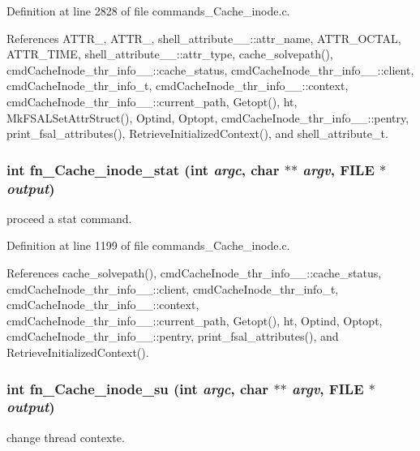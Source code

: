 Definition at line 2828 of file commands\_\-Cache\_\-inode.c.

References ATTR\_, ATTR\_, shell\_\-attribute\_\-\_\-::attr\_\-name, ATTR\_\-OCTAL, ATTR\_\-TIME, shell\_\-attribute\_\-\_\-::attr\_\-type, cache\_\-solvepath(), cmd\-Cache\-Inode\_\-thr\_\-info\_\-\_\-::cache\_\-status, cmd\-Cache\-Inode\_\-thr\_\-info\_\-\_\-::client, cmd\-Cache\-Inode\_\-thr\_\-info\_\-t, cmd\-Cache\-Inode\_\-thr\_\-info\_\-\_\-::context, cmd\-Cache\-Inode\_\-thr\_\-info\_\-\_\-::current\_\-path, Getopt(), ht, Mk\-FSALSet\-Attr\-Struct(), Optind, Optopt, cmd\-Cache\-Inode\_\-thr\_\-info\_\-\_\-::pentry, print\_\-fsal\_\-attributes(), Retrieve\-Initialized\-Context(), and shell\_\-attribute\_\-t.
\subsubsection{\setlength{\rightskip}{0pt plus 5cm}int fn\_\-Cache\_\-inode\_\-stat (int {\em argc}, char $\ast$$\ast$ {\em argv}, FILE $\ast$ {\em output})}\label{commands__Cache__inode_8c_a31}


proceed a stat command. 

Definition at line 1199 of file commands\_\-Cache\_\-inode.c.

References cache\_\-solvepath(), cmd\-Cache\-Inode\_\-thr\_\-info\_\-\_\-::cache\_\-status, cmd\-Cache\-Inode\_\-thr\_\-info\_\-\_\-::client, cmd\-Cache\-Inode\_\-thr\_\-info\_\-t, cmd\-Cache\-Inode\_\-thr\_\-info\_\-\_\-::context, cmd\-Cache\-Inode\_\-thr\_\-info\_\-\_\-::current\_\-path, Getopt(), ht, Optind, Optopt, cmd\-Cache\-Inode\_\-thr\_\-info\_\-\_\-::pentry, print\_\-fsal\_\-attributes(), and Retrieve\-Initialized\-Context().
\subsubsection{\setlength{\rightskip}{0pt plus 5cm}int fn\_\-Cache\_\-inode\_\-su (int {\em argc}, char $\ast$$\ast$ {\em argv}, FILE $\ast$ {\em output})}\label{commands__Cache__inode_8c_a50}


change thread contexte. 

